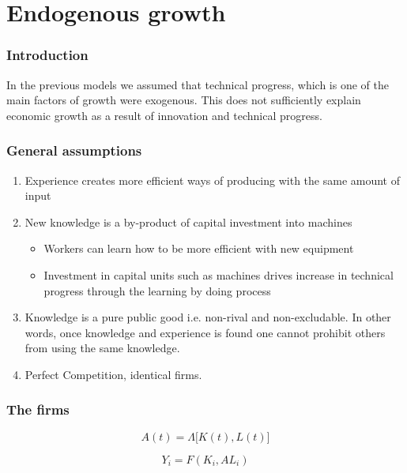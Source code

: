 \section{Endogenous growth}\label{learning-by-doing}
\subsubsection{Introduction}
In the previous models we assumed that technical progress, which is one of the main factors of growth were exogenous. This does not sufficiently explain economic growth as a result of innovation and technical progress. 

\subsubsection{General assumptions}
\begin{enumerate}
    \item Experience creates more efficient ways of producing with the same amount of input
    \item New knowledge is a by-product of capital investment into machines
        \begin{itemize}
            \item Workers can learn how to be more efficient with new equipment
            \item Investment in capital units such as machines drives increase in technical progress through the learning by doing process
        \end{itemize}
    \item Knowledge is a pure public good i.e. non-rival and non-excludable. In other words, once knowledge and experience is found one cannot prohibit others from using the same knowledge. 
    \item Perfect Competition, identical firms. 
\end{enumerate}

\subsubsection{The firms}

\begin{equation}
    A(t)=\Lambda \Big[ K(t), L(t) \Big]
\end{equation}

\begin{equation*}
    Y_i = F(K_i, AL_i)
\end{equation*}

